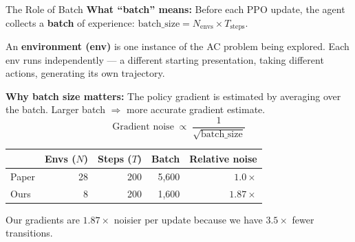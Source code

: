 \documentclass[aspectratio=169,11pt]{beamer}
\begin{document}
\begin{frame}{The Role of Batch}
  \small
  \textbf{What ``batch'' means:}
  Before each PPO update, the agent collects a \textbf{batch} of experience:
  $\text{batch\_size} = N_{\text{envs}} \times T_{\text{steps}}$.

  \smallskip
  An \textbf{environment (env)} is one instance of the AC problem being explored.
  Each env runs independently --- a different starting presentation, taking different
  actions, generating its own trajectory.

  \medskip
  \textbf{Why batch size matters:}
  The policy gradient is estimated by averaging over the batch.
  Larger batch $\Rightarrow$ more accurate gradient estimate.
  \[
    \text{Gradient noise} \;\propto\; \frac{1}{\sqrt{\text{batch\_size}}}
  \]
  \vspace{-8pt}

  \begin{center}
  \small
  \begin{tabular}{lrrrr}
    \toprule
    & \textbf{Envs ($N$)} & \textbf{Steps ($T$)} & \textbf{Batch} & \textbf{Relative noise} \\
    \midrule
    Paper & 28 & 200 & 5{,}600 & $1.0\times$ \\
    Ours  & 8  & 200 & 1{,}600 & $1.87\times$ \\
    \bottomrule
  \end{tabular}
  \end{center}

  \smallskip
  Our gradients are $1.87\times$ noisier per update because we have $3.5\times$ fewer transitions.
\end{frame}
\end{document}
